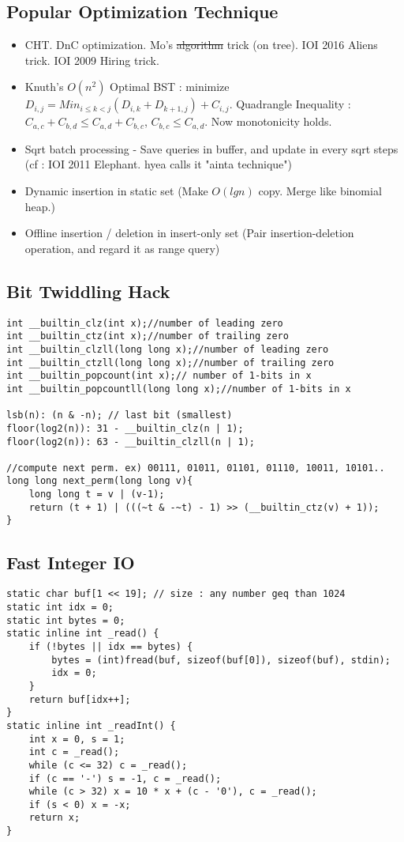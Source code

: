 \documentclass[landscape, 8pt, a4paper, oneside,  twocolumn]{extarticle}
\begin{document}
\subsection {Popular Optimization Technique}
\begin{itemize}
	\item CHT. DnC optimization. Mo's \sout{algorithm} trick (on tree). IOI 2016 Aliens trick. IOI 2009 Hiring trick. 
	\item Knuth's $O(n^2)$ Optimal BST : minimize $D_{i, j} = Min_{i \leq k < j}(D_{i, k} + D_{k+1, j}) + C_{i, j}$. Quadrangle Inequality : $C_{a, c} + C_{b, d} \leq C_{a, d} + C_{b, c}$, $C_{b, c} \leq C_{a, d}$. Now monotonicity holds. 
	\item Sqrt batch processing - Save queries in buffer, and update in every sqrt steps (cf : IOI 2011 Elephant. hyea calls it "ainta technique")
	\item Dynamic insertion in static set (Make $O(lgn)$ copy. Merge like binomial heap.)
	\item Offline insertion / deletion in insert-only set (Pair insertion-deletion operation, and regard it as range query)

\end{itemize}

\subsection {Bit Twiddling Hack}
\begin{verbatim}
int __builtin_clz(int x);//number of leading zero
int __builtin_ctz(int x);//number of trailing zero
int __builtin_clzll(long long x);//number of leading zero
int __builtin_ctzll(long long x);//number of trailing zero
int __builtin_popcount(int x);// number of 1-bits in x
int __builtin_popcountll(long long x);//number of 1-bits in x

lsb(n): (n & -n); // last bit (smallest)
floor(log2(n)): 31 - __builtin_clz(n | 1); 
floor(log2(n)): 63 - __builtin_clzll(n | 1);

//compute next perm. ex) 00111, 01011, 01101, 01110, 10011, 10101..
long long next_perm(long long v){
	long long t = v | (v-1);
	return (t + 1) | (((~t & -~t) - 1) >> (__builtin_ctz(v) + 1));
}
\end{verbatim}

\subsection {Fast Integer IO}
\begin{verbatim}
static char buf[1 << 19]; // size : any number geq than 1024 
static int idx = 0;
static int bytes = 0;
static inline int _read() {
    if (!bytes || idx == bytes) {
        bytes = (int)fread(buf, sizeof(buf[0]), sizeof(buf), stdin);
        idx = 0;
    }
    return buf[idx++];
}
static inline int _readInt() {
    int x = 0, s = 1;
    int c = _read();
    while (c <= 32) c = _read();
    if (c == '-') s = -1, c = _read();
    while (c > 32) x = 10 * x + (c - '0'), c = _read();
    if (s < 0) x = -x;
    return x;
}
\end{verbatim}
\end{document}
